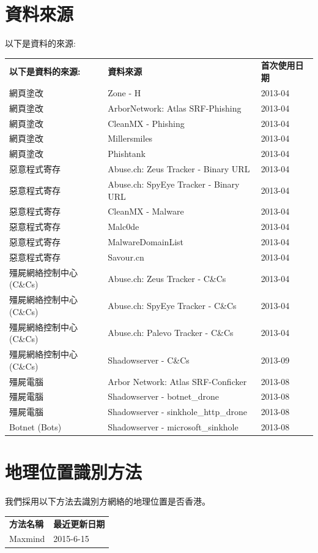 \documentclass[14pt]{extarticle}
\begin{document}
\section{資料來源}
以下是資料的來源:
\begin{table}[!htbp]
\centering
\begin{tabular}{lll}
\hline
{\bf 以下是資料的來源:} & {\bf 資料來源} & \bf 首次使用日期 \\\hhline{===}
網頁塗改 & Zone - H & 2013-04
\\\hline
網頁塗改 & ArborNetwork: Atlas SRF-Phishing & 2013-04
\\\hline
網頁塗改 & CleanMX - Phishing & 2013-04
\\\hline
網頁塗改 & Millersmiles & 2013-04
\\\hline
網頁塗改 & Phishtank & 2013-04
\\\hline
惡意程式寄存 & Abuse.ch: Zeus Tracker - Binary URL & 2013-04
\\\hline
惡意程式寄存 & Abuse.ch: SpyEye Tracker - Binary URL & 2013-04
\\\hline
惡意程式寄存 & CleanMX - Malware & 2013-04
\\\hline
惡意程式寄存 & Malc0de & 2013-04
\\\hline
惡意程式寄存 & MalwareDomainList & 2013-04
\\\hline
惡意程式寄存 & Savour.cn & 2013-04
\\\hline
殭屍網絡控制中心(C\&Cs) & Abuse.ch: Zeus Tracker - C\&Cs & 2013-04
\\\hline
殭屍網絡控制中心(C\&Cs) & Abuse.ch: SpyEye Tracker - C\&Cs & 2013-04
\\\hline
殭屍網絡控制中心(C\&Cs) & Abuse.ch: Palevo Tracker - C\&Cs & 2013-04
\\\hline
殭屍網絡控制中心(C\&Cs) & Shadowserver - C\&Cs & 2013-09
\\\hline
殭屍電腦 & Arbor Network: Atlas SRF-Conficker & 2013-08
\\\hline
殭屍電腦 & Shadowserver - botnet\_drone & 2013-08
\\\hline
殭屍電腦 & Shadowserver - sinkhole\_http\_drone & 2013-08
\\\hline
Botnet (Bots) & Shadowserver - microsoft\_sinkhole & 2013-08
\\\hline
\end{tabular}
\end{table}

\FloatBarrier

\section{地理位置識別方法}
我們採用以下方法去識別方網絡的地理位置是否香港。
\begin{table}[!htbp]
\centering
\begin{tabular}{ll}
\hline
{\bf 方法名稱} & {\bf 最近更新日期} \\\hhline{==}

Maxmind & 2015-6-15
\\\hline
\end{tabular}
\end{table}
\end{document}
